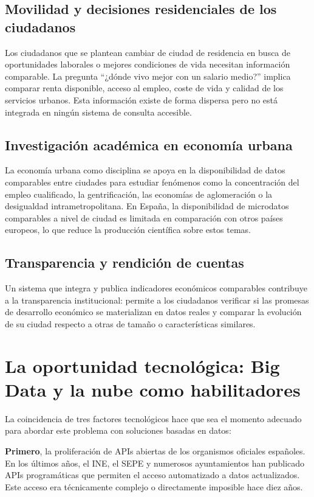 \subsection{Movilidad y decisiones residenciales de los ciudadanos}

Los ciudadanos que se plantean cambiar de ciudad de residencia en busca de oportunidades laborales o mejores condiciones de vida necesitan información comparable. La pregunta ``¿dónde vivo mejor con un salario medio?'' implica comparar renta disponible, acceso al empleo, coste de vida y calidad de los servicios urbanos. Esta información existe de forma dispersa pero no está integrada en ningún sistema de consulta accesible.

\subsection{Investigación académica en economía urbana}

La economía urbana como disciplina \parencite{Glaeser2011TriumphCity} se apoya en la disponibilidad de datos comparables entre ciudades para estudiar fenómenos como la concentración del empleo cualificado, la gentrificación, las economías de aglomeración o la desigualdad intrametropolitana. En España, la disponibilidad de microdatos comparables a nivel de ciudad es limitada en comparación con otros países europeos, lo que reduce la producción científica sobre estos temas.

\subsection{Transparencia y rendición de cuentas}

Un sistema que integra y publica indicadores económicos comparables contribuye a la transparencia institucional: permite a los ciudadanos verificar si las promesas de desarrollo económico se materializan en datos reales y comparar la evolución de su ciudad respecto a otras de tamaño o características similares.

\section{La oportunidad tecnológica: Big Data y la nube como habilitadores}

La coincidencia de tres factores tecnológicos hace que sea el momento adecuado para abordar este problema con soluciones basadas en datos:

\textbf{Primero}, la proliferación de APIs abiertas de los organismos oficiales españoles. En los últimos años, el INE, el SEPE y numerosos ayuntamientos han publicado APIs programáticas que permiten el acceso automatizado a datos actualizados. Este acceso era técnicamente complejo o directamente imposible hace diez años.

